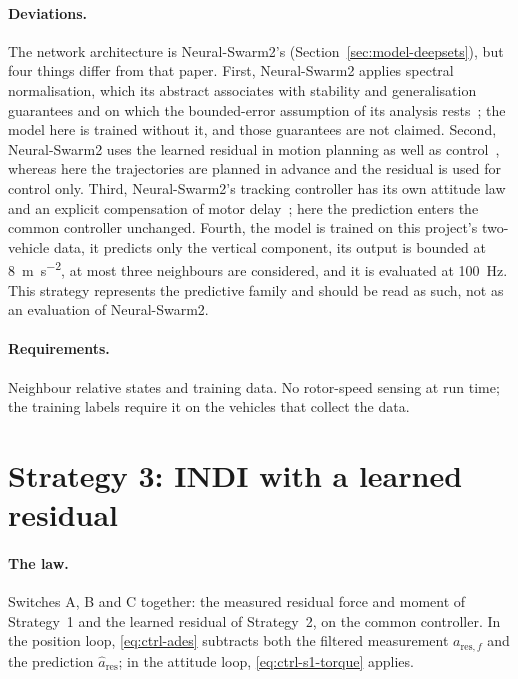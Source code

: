 \paragraph{Deviations.} The network architecture is Neural-Swarm2's
(Section~\ref{sec:model-deepsets}), but four things differ from that paper. First, Neural-Swarm2
applies spectral normalisation, which its abstract associates with stability and generalisation
guarantees and on which the bounded-error assumption of its analysis rests~\cite{shi2022neuralswarm2};
the model here is trained without it, and those guarantees are not claimed. Second, Neural-Swarm2
uses the learned residual in motion planning as well as control~\cite{shi2022neuralswarm2}, whereas
here the trajectories are planned in advance and the residual is used for control only. Third,
Neural-Swarm2's tracking controller has its own attitude law and an explicit compensation of motor
delay~\cite{shi2022neuralswarm2}; here the prediction enters the common controller unchanged.
Fourth, the model is trained on this project's two-vehicle data, it predicts only the vertical
component, its output is bounded at \SI{8}{\metre\per\second\squared}, at most three neighbours
are considered, and it is evaluated at \SI{100}{\hertz}. This strategy represents the predictive
family and should be read as such, not as an evaluation of Neural-Swarm2.

\paragraph{Requirements.} Neighbour relative states and training data. No rotor-speed sensing at
run time; the training labels require it on the vehicles that collect the data.

\section{Strategy 3: INDI with a learned residual}
\label{sec:ctrl-s3}

\paragraph{The law.} Switches A, B and C together: the measured residual force and moment of
Strategy~1 and the learned residual of Strategy~2, on the common controller. In the position loop,
\eqref{eq:ctrl-ades} subtracts both the filtered measurement $a_{\mathrm{res},f}$ and the prediction
$\hat a_{\mathrm{res}}$; in the attitude loop, \eqref{eq:ctrl-s1-torque} applies.

